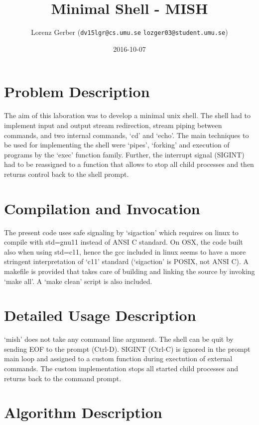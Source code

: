 \documentclass[a4paper,11pt,twoside]{article}
\title{Minimal Shell - MISH}
\author{Lorenz Gerber ({\tt{dv15lgr@cs.umu.se}} {\tt{lozger03@student.umu.se}})}
\date{2016-10-07}
\begin{document}
\lstset{language=C}
\maketitle
\thispagestyle{empty}
\newpage
\tableofcontents
\thispagestyle{empty}
\newpage

\clearpage
{}

\section{Problem Description} 
The aim of this laboration was to develop a minimal unix shell. The shell had to implement input and output stream redirection, stream piping between commands, and two internal commands, `cd' and `echo'. The main techniques to be used for implementing the shell were `pipes', `forking' and execution of programs by the `exec' function family. Further, the interrupt signal (SIGINT) had to be reassigned to a function that allows to stop all child processes and then returns control back to the shell prompt.

\section{Compilation and Invocation}
The present code uses safe signaling by `sigaction' which requires on linux to compile with std=gnu11 instead of ANSI C standard. On OSX, the code built also when using std=c11, hence the gcc included in linux seems to have a more stringent interpretation of `c11' standard (`sigaction' is POSIX, not ANSI C). A makefile is provided that takes care of building and linking the source by invoking `make all'. A `make clean' script is also included. 

\section{Detailed Usage Description}
`mish' does not take any command line argument. The shell can be quit by sending EOF to the prompt (Ctrl-D). SIGINT (Ctrl-C) is ignored in the prompt main loop and assigned to a custom function during exectution of external commands. The custom implementation stops all started child processes and returns back to the command prompt. 

\section{Algorithm Description}
\end{document}
